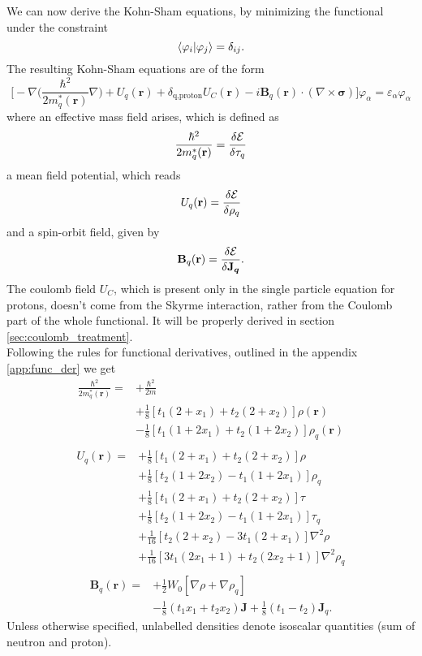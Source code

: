 We can now derive the Kohn-Sham equations, by minimizing the functional under the constraint
\begin{equation}
    \label{eq:spe_ks_constraint}
    \bra{\varphi_i}\ket{\varphi_j}=\delta_{ij}.
\end{equation}
The resulting Kohn-Sham equations are of the form
\begin{equation}
    \label{eq:spe_ks}
    \bigg[-\nabla\bigg(\frac{\hbar^2}{2m^{*}_q(\mathbf r)}\nabla \bigg) + U_q(\mathbf r) + \delta_{\text{q,proton}}U_C(\mathbf r)-i\mathbf B_q(\mathbf r)\cdot(\nabla \times \boldsymbol\sigma) \bigg]\varphi_\alpha=\varepsilon_\alpha\varphi_\alpha
\end{equation}
where an effective mass field arises, which is defined as
\begin{equation}
    \frac{\hbar^2}{2m^{*}_q(\mathbf r)} = \fdv{\mathcal E}{\tau_q}
\end{equation}
a mean field potential, which reads
\begin{equation}
    U_q(\mathbf r) = \fdv{\mathcal E}{\rho_q}\label{eq:fdv_rho_skyrme}
\end{equation}
and a spin-orbit field, given by
\begin{equation}
    \mathbf B_q(\mathbf r) = \fdv{\mathcal E}{\boldsymbol{\mathbf J_q}}.
\end{equation}
The coulomb field $U_C$, which is present only in the single particle equation for protons, doesn't come from the Skyrme interaction, rather from the Coulomb part of the whole functional. It will be properly derived in section \ref{sec:coulomb_treatment}.
\\Following the rules for functional derivatives, outlined in the appendix \ref{app:func_der} we get
\begin{align}
    \frac{\hbar^2}{2m_q^*(\mathbf r)} =& +\frac{\hbar^2}{2m} \nonumber
    \\&+ \frac 1 8 [t_1(2+x_1)+t_2(2+x_2)]\rho(\mathbf r) \nonumber
    \\&- \frac 1 8 [t_1(1+2x_1)+t_2(1+2x_2)]\rho_q(\mathbf r ) \\\nonumber
\end{align}
\begin{align}
    U_q(\mathbf r) =& +\frac 1 8 [t_1(2+x_1)+t_2(2+x_2)]\rho \nonumber
    \\&+ \frac 1 8 [t_2(1+2x_2)-t_1(1+2x_1)]\rho_q \nonumber
    \\&+ \frac 1 8 [t_1(2+x_1)+t_2(2+x_2)]\tau \nonumber
    \\&+ \frac 1 8 [t_2(1+2x_2)-t_1(1+2x_1)]\tau_q \nonumber
    \\
    &+ \frac 1 {16} [t_2(2+x_2)-3t_1(2+x_1)] \nabla^2 \rho \nonumber
    \\&+ \frac 1 {16} [3t_1(2x_1+1)+t_2(2x_2+1)] \nabla^2 \rho_q \\\nonumber
\end{align}
\begin{align}
    \mathbf B_q (\mathbf r ) = &+\frac 1 2 W_0 [\nabla\rho + \nabla \rho_q] \nonumber\\
    &-\frac 1 8 (t_1 x_1 + t_2 x_2) \mathbf J + \frac 1 8 (t_1 - t_2) \mathbf J_q.
\end{align}
Unless otherwise specified, unlabelled densities denote isoscalar quantities (sum of neutron and proton).